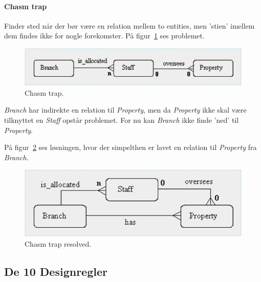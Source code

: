 \paragraph{Chasm trap} 

Finder sted når der bør være en relation mellem to entities, men 'stien' imellem dem findes ikke for nogle forekomster. På figur~\ref{fig:chasm} ses problemet.

\begin{figure}[H]
\centering
\includegraphics[width=0.75\linewidth]{figs/spm2/chasm}
\caption{Chasm trap.}
\label{fig:chasm}
\end{figure}

\textit{Branch} har indirekte en relation til \textit{Property}, men da \textit{Property} ikke skal være tilknyttet en \textit{Staff} opstår problemet. For nu kan \textit{Branch} ikke finde 'ned' til \textit{Property}.

På figur~\ref{fig:chasm_solved} ses løsningen, hvor der simpelthen er lavet en relation til \textit{Property} fra \textit{Branch}.

\begin{figure}[H]
\centering
\includegraphics[width=0.7\linewidth]{figs/spm2/chasm_solved}
\caption{Chasm trap resolved.}
\label{fig:chasm_solved}
\end{figure}


\subsection{De 10 Designregler}

